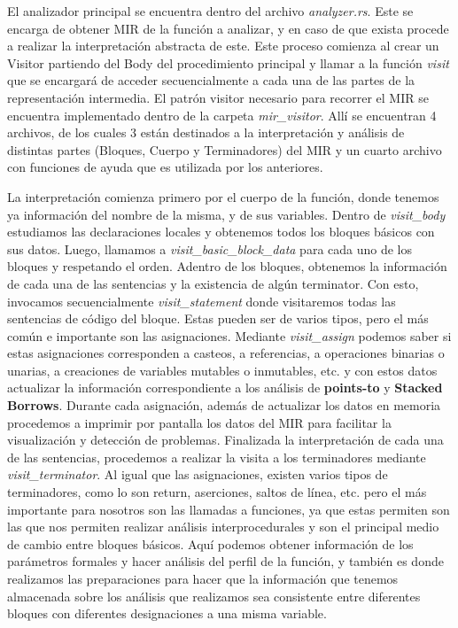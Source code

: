 El analizador principal se encuentra dentro del archivo \textit{analyzer.rs}. Este se encarga de obtener MIR de la función a analizar, y en caso de que exista procede a realizar la interpretación abstracta de este. Este proceso comienza al crear un Visitor partiendo del Body del procedimiento principal y llamar a la función \textit{visit} que se encargará de acceder secuencialmente a cada una de las partes de la representación intermedia. El patrón visitor necesario para recorrer el MIR se encuentra implementado dentro de la carpeta \textit{mir\_visitor}. Allí se encuentran 4 archivos, de los cuales 3 están destinados a la interpretación y análisis de distintas partes (Bloques, Cuerpo y Terminadores) del MIR y un cuarto archivo con funciones de ayuda que es utilizada por los anteriores.

La interpretación comienza primero por el cuerpo de la función, donde tenemos ya información del nombre de la misma, y de sus variables. Dentro de \textit{visit\_body} estudiamos las declaraciones locales y obtenemos todos los bloques básicos con sus datos. Luego, llamamos a \textit{visit\_basic\_block\_data} para cada uno de los bloques y respetando el orden. Adentro de los bloques, obtenemos la información de cada una de las sentencias y la existencia de algún terminator. Con esto, invocamos secuencialmente \textit{visit\_statement} donde visitaremos todas las sentencias de código del bloque. Estas pueden ser de varios tipos, pero el más común e importante son las asignaciones. Mediante \textit{visit\_assign} podemos saber si estas asignaciones corresponden a casteos, a referencias, a operaciones binarias o unarias, a creaciones de variables mutables o inmutables, etc. y con estos datos actualizar la información correspondiente a los análisis de \textbf{points-to} y \textbf{Stacked Borrows}. Durante cada asignación, además de actualizar los datos en memoria procedemos a imprimir por pantalla los datos del MIR para facilitar la visualización y detección de problemas. Finalizada la interpretación de cada una de las sentencias, procedemos a realizar la visita a los terminadores mediante \textit{visit\_terminator}. Al igual que las asignaciones, existen varios tipos de terminadores, como lo son return, aserciones, saltos de línea, etc. pero el más importante para nosotros son las llamadas a funciones, ya que estas permiten son las que nos permiten realizar análisis interprocedurales y son el principal medio de cambio entre bloques básicos. Aquí podemos obtener información de los parámetros formales y hacer análisis del perfil de la función, y también es donde realizamos las preparaciones para hacer que la información que tenemos almacenada sobre los análisis que realizamos sea consistente entre diferentes bloques con diferentes designaciones a una misma variable.

